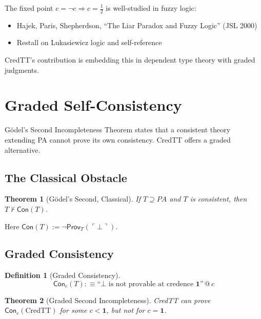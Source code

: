 \documentclass[11pt,a4paper]{article}
\makeatletter
\newtheorem{definition}{Definition}[section]
\newtheorem{theorem}{Theorem}[section]
\newcommand{\at}[1]{\,@\,#1}
\newcommand{\one}{\mathbf{1}}
\newcommand{\negc}{\neg}
\makeatother
\begin{document}
The fixed point $c = \negc c \Rightarrow c = \frac{1}{2}$ is well-studied in fuzzy logic:

\begin{itemize}
    \item Hajek, Paris, Shepherdson, ``The Liar Paradox and Fuzzy Logic'' (JSL 2000) \citep{hajek2000liar}
    \item Restall on Lukasiewicz logic and self-reference
\end{itemize}

CredTT's contribution is embedding this in dependent type theory with graded judgments.

\section{Graded Self-Consistency}

G\"odel's Second Incompleteness Theorem states that a consistent theory extending PA cannot prove its own consistency. CredTT offers a graded alternative.

\subsection{The Classical Obstacle}

\begin{theorem}[G\"odel's Second, Classical]
If $T \supseteq PA$ and $T$ is consistent, then $T \not\vdash \mathsf{Con}(T)$.
\end{theorem}

Here $\mathsf{Con}(T) := \neg\mathsf{Prov}_T(\ulcorner \bot \urcorner)$.

\subsection{Graded Consistency}

\begin{definition}[Graded Consistency]
\[
\mathsf{Con}_c(T) :\equiv \text{``$\bot$ is not provable at credence $\one$''} \at{c}
\]
\end{definition}

\begin{theorem}[Graded Second Incompleteness]\label{thm:graded-second-incompleteness}
CredTT can prove $\mathsf{Con}_c(\text{CredTT})$ for some $c < \one$, but not for $c = \one$.
\end{theorem}
\end{document}
